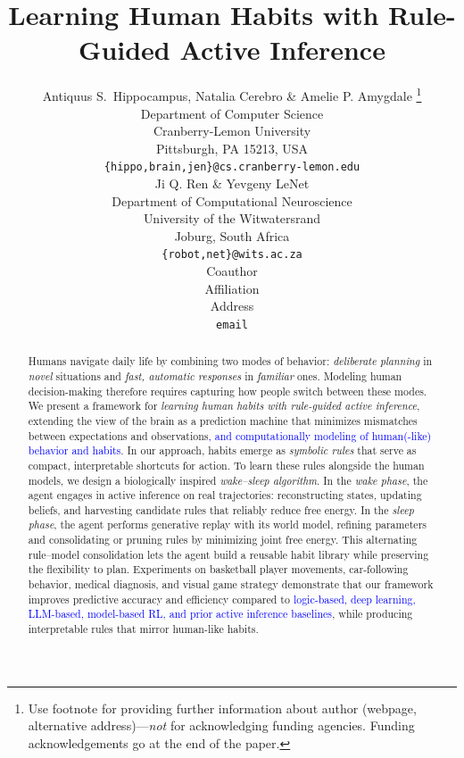 \documentclass{article} %
\title{Learning Human Habits with Rule-Guided Active Inference}
\author{Antiquus S.~Hippocampus, Natalia Cerebro \& Amelie P. Amygdale \thanks{ Use footnote for providing further information
about author (webpage, alternative address)---\emph{not} for acknowledging
funding agencies.  Funding acknowledgements go at the end of the paper.} \\
Department of Computer Science\\
Cranberry-Lemon University\\
Pittsburgh, PA 15213, USA \\
\texttt{\{hippo,brain,jen\}@cs.cranberry-lemon.edu} \\
\And
Ji Q. Ren \& Yevgeny LeNet \\
Department of Computational Neuroscience \\
University of the Witwatersrand \\
Joburg, South Africa \\
\texttt{\{robot,net\}@wits.ac.za} \\
\AND
Coauthor \\
Affiliation \\
Address \\
\texttt{email}
}
\newcommand{\revise}[1]{\textcolor{blue}{#1}}
\begin{document}
\maketitle

\begin{abstract}
Humans navigate daily life by combining two modes of behavior: {\it deliberate planning} in {\it novel} situations and {\it fast, automatic responses} in {\it familiar} ones. Modeling human decision-making therefore requires capturing how people switch between these modes. We present a framework for \emph{learning human habits with rule-guided active inference}, extending the view of the brain as a prediction machine that minimizes mismatches between expectations and observations\revise{, and computationally modeling of human(-like) behavior and habits}. In our approach, habits emerge as \emph{symbolic rules} that serve as compact, interpretable shortcuts for action. To learn these rules alongside the human models, we design a biologically inspired \emph{wake--sleep algorithm}. In the \emph{wake phase}, the agent engages in active inference on real trajectories: reconstructing states, updating beliefs, and harvesting candidate rules that reliably reduce free energy. In the \emph{sleep phase}, the agent performs generative replay with its world model, refining parameters and consolidating or pruning rules by minimizing joint free energy. This alternating rule–model consolidation lets the agent build a reusable habit library while preserving the flexibility to plan. Experiments on basketball player movements, car-following behavior, medical diagnosis, and visual game strategy demonstrate that our framework improves predictive accuracy and efficiency compared to \revise{logic-based, deep learning, LLM-based, model-based RL, and prior active inference baselines}, while producing interpretable rules that mirror human-like habits.
\end{abstract}
\end{document}

